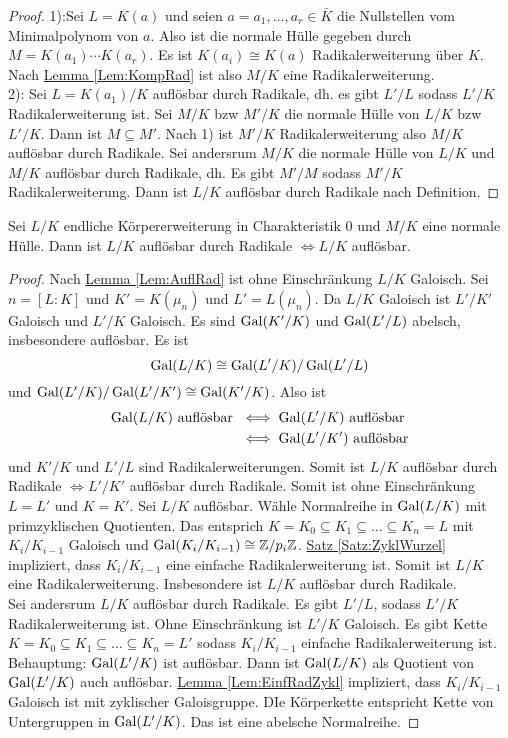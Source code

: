 \begin{proof}
    1):Sei $L=K(a)$ und seien $a=a_1,\dots,a_r\in\bar K$ die Nullstellen vom Minimalpolynom von $a$. Also ist die normale Hülle gegeben durch $M=K(a_1)\cdots K(a_r)$.
    Es ist $K(a_i)\cong K(a)$ Radikalerweiterung über $K$. Nach \hyperref[Lem:KompRad]{Lemma \ref{Lem:KompRad}} ist also $M/K$ eine Radikalerweiterung.\\
    2): Sei $L=K(a_1)/K$ auflösbar durch Radikale, dh. es gibt $L'/L$ sodass $L'/K$ Radikalerweiterung ist. Sei $M/K$ bzw $M'/K$ die normale Hülle von $L/K$ bzw $L'/K$. Dann ist $M\subseteq M'$. Nach 1) ist $M'/K$ Radikalerweiterung also $M/K$ auflösbar durch Radikale.
    Sei andersrum $M/K$ die normale Hülle von $L/K$ und $M/K$ auflösbar durch Radikale, dh. Es gibt $M'/M$ sodass $M'/K$ Radikalerweiterung. Dann ist $L/K$ auflösbar durch Radikale nach Definition.
\end{proof}
\begin{Satz}
    Sei $L/K$ endliche Körpererweiterung in Charakteristik $0$ und $M/K$ eine normale Hülle. Dann ist $L/K$ auflösbar durch Radikale $\iff L/K$ auflösbar.
\end{Satz}
\begin{proof}
    Nach \hyperref[Lem:AuflRad]{Lemma \ref{Lem:AuflRad}} ist ohne Einschränkung $L/K$ Galoisch.
    Sei $n=[L:K]$ und $K'=K(\mu_n)$ und $L'=L(\mu_n)$.
    Da $L/K$ Galoisch ist $L'/K'$ Galoisch und $L'/K$ Galoisch. Es sind $\operatorname{Gal}(K'/K)$ und $\operatorname{Gal}(L'/L)$ abelsch, insbesondere auflösbar.
    Es ist $$\operatorname{Gal}(L/K)\cong \operatorname{Gal}(L'/K)/\operatorname{Gal}(L'/L)$$ und $\operatorname{Gal}(L'/K)/\operatorname{Gal}(L'/K')\cong \operatorname{Gal}(K'/K)$.
    Also ist \begin{align*}
        \operatorname{Gal}(L/K)\text{ auflösbar }&\iff \operatorname{Gal}(L'/K) \text{ auflösbar}\\
        &\iff \operatorname{Gal}(L'/K') \text{ auflösbar}
    \end{align*}
    und $K'/K$ und $L'/L$ sind Radikalerweiterungen. Somit ist $L/K$ auflösbar durch Radikale $\iff L'/K'$ auflösbar durch Radikale. Somit ist ohne Einschränkung $L=L'$ und $K=K'$.
    Sei $L/K$ auflösbar. Wähle Normalreihe in $\operatorname{Gal}(L/K)$ mit primzyklischen Quotienten. Das entsprich $K=K_0\subseteq K_1\subseteq\dots\subseteq K_n=L$ mit $K_i/K_{i-1}$ Galoisch und $\operatorname{Gal}(K_i/K_{i-1})\cong \mathbb{Z}/p_i\mathbb{Z}$.  \hyperref[Satz:ZyklWurzel]{Satz \ref{Satz:ZyklWurzel}} impliziert, dass $K_i/K_{i-1}$ eine einfache Radikalerweiterung ist. Somit ist $L/K$ eine Radikalerweiterung. Insbesondere ist $L/K$ auflösbar durch Radikale.\\
    Sei andersrum $L/K$ auflösbar durch Radikale. Es gibt $L'/L$, sodass $L'/K$ Radikalerweiterung ist. Ohne Einschränkung ist $L'/K$ Galoisch. Es gibt Kette $K=K_0\subseteq K_1\subseteq\dots\subseteq K_n=L'$ sodass $K_i/K_{i-1}$ einfache Radikalerweiterung ist.
    Behauptung: $\operatorname{Gal}(L'/K)$ ist auflösbar. Dann ist $\operatorname{Gal}(L/K)$ als Quotient von $\operatorname{Gal}(L'/K)$ auch auflösbar.
    \hyperref[Lem:EinfRadZykl]{Lemma \ref{Lem:EinfRadZykl}} impliziert, dass $K_i/K_{i-1}$ Galoisch ist mit zyklischer Galoisgruppe. DIe Körperkette entspricht Kette von Untergruppen in $\operatorname{Gal}(L'/K)$. Das ist eine abelsche Normalreihe.
\end{proof}
